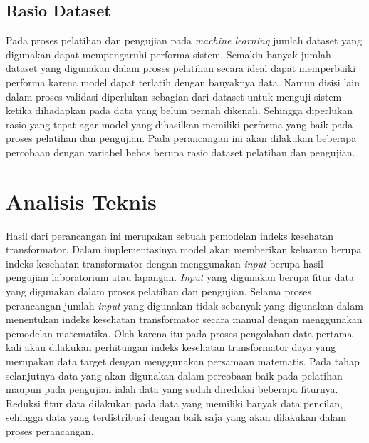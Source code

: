 \subsection{Rasio Dataset}
Pada proses pelatihan dan pengujian pada \textit{machine learning} jumlah dataset yang digunakan dapat mempengaruhi performa sistem. Semakin banyak jumlah dataset yang digunakan dalam proses pelatihan secara ideal dapat memperbaiki performa karena model dapat terlatih dengan banyaknya data. Namun disisi lain dalam proses validasi diperlukan sebagian dari dataset untuk menguji sistem ketika dihadapkan pada data yang belum pernah dikenali. Sehingga diperlukan rasio yang tepat agar model yang dihasilkan memiliki performa yang baik pada proses pelatihan dan pengujian. Pada perancangan ini akan dilakukan beberapa percobaan dengan variabel bebas berupa rasio dataset pelatihan dan pengujian.

\section{Analisis Teknis}

Hasil dari perancangan ini merupakan sebuah pemodelan indeks kesehatan transformator. Dalam implementasinya model akan memberikan keluaran berupa indeks kesehatan transformator dengan menggunakan \textit{input} berupa hasil pengujian laboratorium atau lapangan. \textit{Input} yang digunakan berupa fitur data yang digunakan dalam proses pelatihan dan pengujian. Selama proses perancangan jumlah \textit{input} yang digunakan tidak sebanyak yang digunakan dalam menentukan indeks kesehatan transformator secara manual dengan menggunakan pemodelan matematika. Oleh karena itu pada proses pengolahan data pertama kali akan dilakukan perhitungan indeks kesehatan transformator daya yang merupakan data target dengan menggunakan persamaan matematis. Pada tahap selanjutnya data yang akan digunakan dalam percobaan baik pada pelatihan maupun pada pengujian ialah data yang sudah direduksi beberapa fiturnya. Reduksi fitur data dilakukan pada data yang memiliki banyak data pencilan, sehingga data yang terdistribusi dengan baik saja yang akan dilakukan dalam proses perancangan. \par

